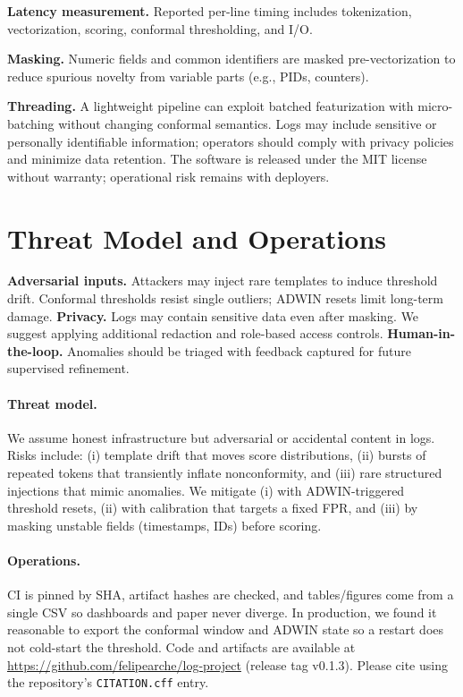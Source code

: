 \documentclass[10pt,twocolumn]{article}
\begin{document}
\textbf{Latency measurement.} Reported per-line timing includes tokenization, vectorization, scoring, conformal thresholding, and I/O.

\textbf{Masking.} Numeric fields and common identifiers are masked pre-vectorization to reduce spurious novelty from variable parts (e.g., PIDs, counters).

\textbf{Threading.} A lightweight pipeline can exploit batched featurization with micro-batching without changing conformal semantics.
Logs may include sensitive or personally identifiable information; operators should comply with privacy policies and minimize data retention.
The software is released under the MIT license without warranty; operational risk remains with deployers.
\section{Threat Model and Operations}

\textbf{Adversarial inputs.} Attackers may inject rare templates to induce threshold drift. Conformal thresholds resist single outliers; ADWIN resets limit long-term damage.
\textbf{Privacy.} Logs may contain sensitive data even after masking. We suggest applying additional redaction and role-based access controls.
\textbf{Human-in-the-loop.} Anomalies should be triaged with feedback captured for future supervised refinement.
\paragraph{Threat model.} We assume honest infrastructure but adversarial or accidental content in logs. Risks include: (i) template drift that moves score distributions, (ii) bursts of repeated tokens that transiently inflate nonconformity, and (iii) rare structured injections that mimic anomalies. We mitigate (i) with ADWIN-triggered threshold resets, (ii) with calibration that targets a fixed FPR, and (iii) by masking unstable fields (timestamps, IDs) before scoring.
\paragraph{Operations.} CI is pinned by SHA, artifact hashes are checked, and tables/figures come from a single CSV so dashboards and paper never diverge. In production, we found it reasonable to export the conformal window and ADWIN state so a restart does not cold-start the threshold.
Code and artifacts are available at \url{https://github.com/felipearche/log-project} (release tag v0.1.3).
Please cite using the repository's \texttt{CITATION.cff} entry.
\end{document}
